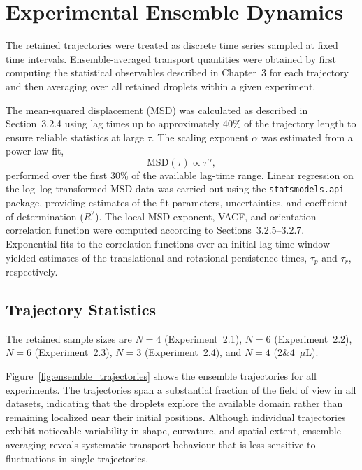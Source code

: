 \section{Experimental Ensemble Dynamics}

The retained trajectories were treated as discrete time series sampled at fixed time intervals. Ensemble-averaged transport quantities were obtained by first computing the statistical observables described in Chapter~3 for each trajectory and then averaging over all retained droplets within a given experiment.

The mean-squared displacement (MSD) was calculated as described in Section~3.2.4 using lag times up to approximately 40\% of the trajectory length to ensure reliable statistics at large $\tau$. The scaling exponent $\alpha$ was estimated from a power-law fit,
\begin{equation}
\mathrm{MSD}(\tau)\propto\tau^{\alpha},
\end{equation}
performed over the first 30\% of the available lag-time range. Linear regression on the log--log transformed MSD data was carried out using the \texttt{statsmodels.api} package, providing estimates of the fit parameters, uncertainties, and coefficient of determination ($R^2$).
The local MSD exponent, VACF, and orientation correlation function were computed according to Sections~3.2.5--3.2.7. Exponential fits to the correlation functions over an initial lag-time window yielded estimates of the translational and rotational persistence times, $\tau_p$ and $\tau_r$, respectively.

\subsection{Trajectory Statistics}

The retained sample sizes are $N=4$ (Experiment~2.1), $N=6$ (Experiment~2.2),
$N=6$ (Experiment~2.3), $N=3$ (Experiment~2.4), and $N=4$ (2\&4~$\mu$L).

Figure~\ref{fig:ensemble_trajectories} shows the ensemble trajectories for all experiments. The trajectories span a substantial fraction of the field of view in all datasets, indicating that the droplets explore the available domain rather than remaining localized near their initial positions. Although individual trajectories exhibit noticeable variability in shape, curvature, and spatial extent, ensemble averaging reveals systematic transport behaviour that is less sensitive to fluctuations in single trajectories.

